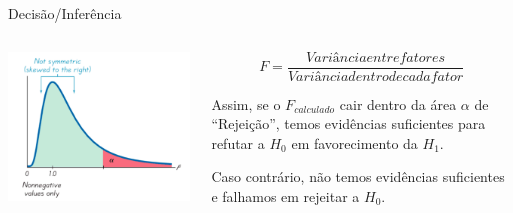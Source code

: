\documentclass{bredelebeamer}
\begin{document}
\begin{frame}
\begin{block}{Decisão/Inferência}
\begin{columns}
\begin{column}{.3\textwidth}
\centering\includegraphics[scale=.2]{images/F.png}
\end{column}

\begin{column}{.7\textwidth}
\footnotesize{
\[
F = \frac{Variância entre fatores}{Variância dentro de cada fator}
\]

\vspace{.5cm}

Assim, se o $F_{calculado}$ cair dentro da área $\alpha$ de
``Rejeição'', temos evidências suficientes para refutar a $H_{0}$ em
favorecimento da $H_{1}$.

\vspace{.5cm}

Caso contrário, não temos evidências suficientes e falhamos em rejeitar
a $H_{0}$.
}
\end{column}
\end{columns}
\end{block}
\end{frame}
\end{document}
